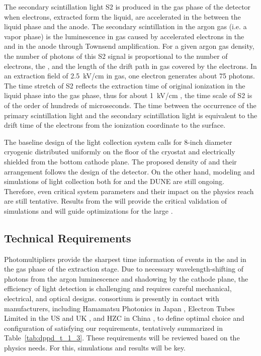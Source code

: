 The secondary scintillation light S2 is produced in the gas phase of the detector when electrons, extracted form the liquid, are accelerated in the \efield between the liquid phase and the anode. The secondary scintillation in the argon gas (i.e. a vapor phase) is the luminescence in gas caused by accelerated electrons in the \efield and in the  anode through Townsend amplification. For a given argon gas density, the number of photons of this S2 signal is proportional to the number of electrons, the \efield, and the length of the drift path in gas covered by the electrons. In an extraction field of \SI{2.5}{kV/cm} in gas, one electron generates about \num{75} photons. The time stretch of S2 reflects the extraction time of original ionization in the liquid phase into the gas phase, thus for about \SI{1}{kV/cm} \efield, the time scale of S2 is of the order of hundreds of microseconds. The time between the occurrence of the primary scintillation light and the secondary scintillation light is equivalent to the drift time of the electrons from the ionization coordinate to the \lar surface.

The baseline design of the light collection system calls for 8-inch diameter cryogenic  distributed uniformly on the floor of the cryostat and electrically shielded from the bottom cathode plane. The proposed density of  and their arrangement follows the design of the  detector. On the other hand, modeling and simulations of light collection both for  and the DUNE  are still ongoing. Therefore, even critical system parameters and their impact on the physics reach are still tentative. Results from the  will provide the critical validation of simulations and will guide optimizations for the large .

\subsection{Technical Requirements}
\label{sec:fddp-pd-1.3}

Photomultipliers provide the sharpest time information of events in the \lartpc and in the gas phase of the extraction stage. Due to necessary wavelength-shifting of photons from the argon luminescence and shadowing by the cathode plane, the efficiency of light detection is challenging and requires careful mechanical, electrical, and optical designs. \dual {} consortium is presently in contact with  manufacturers, including Hamamatsu Photonics in Japan \cite{hamamatsu}, Electron Tubes Limited in the US and UK \cite{electrontubeslim}, and HZC in China \cite{hzc}, to define optimal choice and configuration of  satisfying our requirements, tentatively summarized in Table~\ref{tab:dppd_t_1_3}. These requirements will be reviewed based on the physics needs. For this, simulations and  results will be key.

